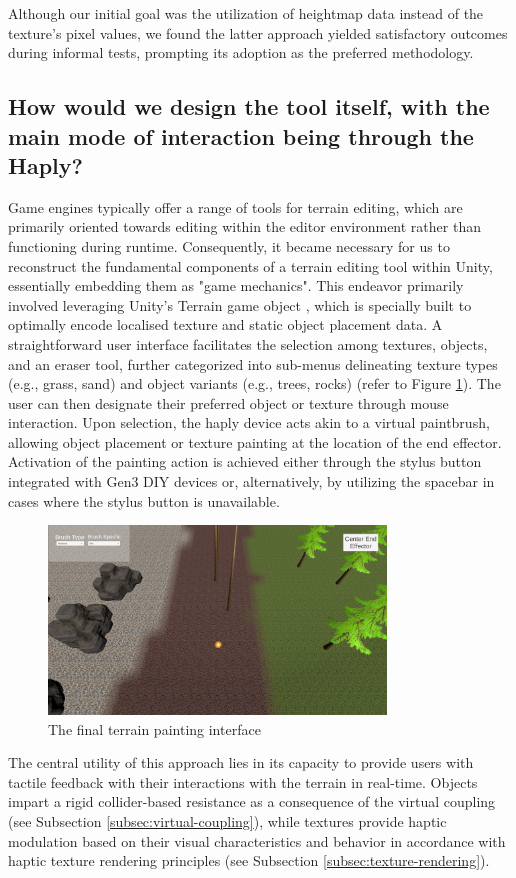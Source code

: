 Although our initial goal was the utilization of heightmap data instead of the texture's pixel values, we found the latter approach yielded satisfactory outcomes during informal tests, prompting its adoption as the preferred methodology.

\subsection{How would we design the tool itself, with the main mode of interaction being through the Haply?} \label{subsec:terrain-painting}

Game engines typically offer a range of tools for terrain editing, which are primarily oriented towards editing within the editor environment rather than functioning during runtime. Consequently, it became necessary for us to reconstruct the fundamental components of a terrain editing tool within Unity, essentially embedding them as "game mechanics". This endeavor primarily involved leveraging Unity's Terrain game object \cite{unityterrain}, which is specially built to optimally encode localised texture and static object placement data. A straightforward user interface facilitates the selection among textures, objects, and an eraser tool, further categorized into sub-menus delineating texture types (e.g., grass, sand) and object variants (e.g., trees, rocks) (refer to Figure \ref{fig:terrain-painting}). The user can then designate their preferred object or texture through mouse interaction. Upon selection, the haply device acts akin to a virtual paintbrush, allowing object placement or texture painting at the location of the end effector. Activation of the painting action is achieved either through the stylus button integrated with Gen3 DIY devices or, alternatively, by utilizing the spacebar in cases where the stylus button is unavailable.

\begin{figure}[htbp]
    \centering
    \includegraphics[width=0.8\textwidth]{images/approach-terrain-painter.png} 
    \caption{The final terrain painting interface}
    \label{fig:terrain-painting}
\end{figure}

The central utility of this approach lies in its capacity to provide users with tactile feedback with their interactions with the terrain in real-time. Objects impart a rigid collider-based resistance as a consequence of the virtual coupling (see Subsection \ref{subsec:virtual-coupling}), while textures provide haptic modulation based on their visual characteristics and behavior in accordance with haptic texture rendering principles (see Subsection \ref{subsec:texture-rendering}).
